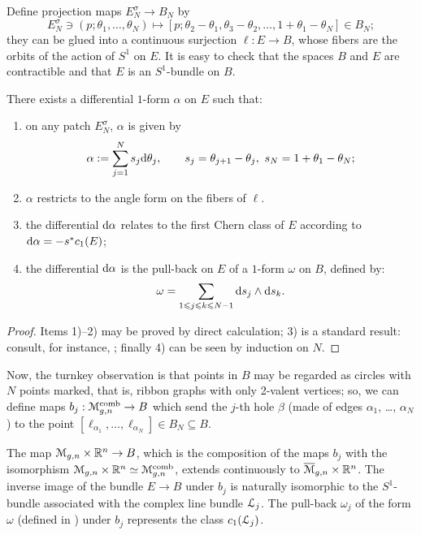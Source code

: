 Define projection maps $E^\sigma_N \to B_N$ by 
\begin{equation*}
  E_N^\sigma \ni (p; \theta_1, \ldots, \theta_N) \mapsto [p; \theta_2 - \theta_1, \theta_3 - \theta_2, \ldots, 1
  + \theta_1 - \theta_N] \in B_N;
\end{equation*}
they can be glued into a continuous surjection $\ell: E \to B$, whose
fibers are the orbits of the action of $S^1$ on $E$. It is easy to
check that the spaces $B$ and $E$ are contractible and that $E$ is an
$S^1$-bundle on $B$.
\begin{lemma}
  \label{thm:comb-bundle}
  There exists a differential $1$-form $\alpha$ on $E$ such that:
  \begin{enumerate}
  \item on any patch $E^\sigma_N$, $\alpha$ is given by
    \begin{equation*}
      \alpha := \sum_{j=1}^N s_j \mathrm{d}\theta_j, \qquad s_j= \theta_{j+1} - \theta_j, \ s_N = 1 +
      \theta_1 - \theta_N;
    \end{equation*}
  \item $\alpha$  restricts to the angle form on the fibers of $\ell$.
  \item   the differential $\mathrm{d}\alpha$ relates to the first Chern class of $E$
    according to $\mathrm{d}\alpha = -s^*c_1(E)$;
  \item the differential $\mathrm{d}\alpha$ is the pull-back on $E$ of a $1$-form $\omega$
    on $B$, defined by:
    \begin{equation*}
      \omega = \sum_{1\leqslant j\leqslant k\leqslant N-1} \mathrm{d} s_j \land \mathrm{d} s_k.
    \end{equation*}
  \end{enumerate}
\end{lemma}
\begin{proof}
  Items 1)--2) may be proved by direct calculation; 3) is a standard
  result: consult, for instance, \cite{bott-tu}; finally 4) can be
  seen by induction on $N$.
\end{proof}

Now, the turnkey observation is that points in $B$ may be regarded as
circles with $N$ points marked, that is, ribbon graphs with only
2-valent vertices; so, we can define maps $b_j: \mathcal{M}\sp{\text{comb}}_{g,n} \to B$ which
send the $j$-th hole $\beta$ (made of edges $\alpha_1$, \ldots, $\alpha_N$) to the
point $[\ell_{\alpha_1}, \ldots, \ell_{\alpha_N}] \in B_N \subseteq B$. 
\begin{theorem}
  The map $\mathcal{M}_{g,n} \times \mathbb{R}^n \to B$, which is the composition of the
  maps $b_j$ with the isomorphism $\mathcal{M}_{g,n} \times \mathbb{R}^n \simeq
  \mathcal{M}\sp{\text{comb}}_{g,n}$, extends continuously to $\overline{\mathcal{M}}_{g,n} \times \mathbb{R}^n$. The
  inverse image of the bundle $E \to B$ under $b_j$ is naturally
  isomorphic to the $S^1$-bundle associated with the complex line
  bundle ${\mathcal{L}}_j$. The pull-back $\omega_j$ of the form $\omega$ (defined in
  ) under $b_j$ represents the class
  $c_1({\mathcal{L}}_j)$. 
\end{theorem}


